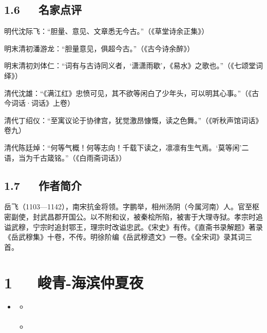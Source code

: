 \documentclass[letterpaper,12pt,english]{sphinxmanual}
\begin{document}
\section{1.6   名家点评}
\label{\detokenize{p01_u6563_u6587/_u5cb3_u98de-_u6ee1_u6c5f_u7ea2_xb7_u6012_u53d1_u51b2_u51a0:id8}}
明代沈际飞：“胆量、意见、文章悉无今古。”（《草堂诗余正集》）

明末清初潘游龙：“胆量意见，俱超今古。”（《古今诗余醉》）

明末清初刘体仁：“词有与古诗同义者，‘潇潇雨歇’，《易水》之歌也。”（《七颂堂词绎》）

清代沈雄：“《满江红》忠愤可见，其不欲等闲白了少年头，可以明其心事。”（《古今词话·词话》上卷）

清代丁绍仪：“至寓议论于协律宫，犹觉激昂慷慨，读之色舞。”（《听秋声馆词话》卷九）

清代陈廷焯：“何等气概！何等志向！千载下读之，凛凛有生气焉。‘莫等闲’二语，当为千古箴铭。”（《白雨斋词话》）


\section{1.7   作者简介}
\label{\detokenize{p01_u6563_u6587/_u5cb3_u98de-_u6ee1_u6c5f_u7ea2_xb7_u6012_u53d1_u51b2_u51a0:id9}}
岳飞（1103—1142），南宋抗金将领。字鹏举，相州汤阴（今属河南）人。官至枢密副使，封武昌郡开国公。以不附和议，被秦桧所陷，被害于大理寺狱。孝宗时追谥武穆，宁宗时追封鄂王，理宗时改谥忠武。《宋史》有传。《直斋书录解题》著录《岳武穆集》十卷，不传。明徐阶编《岳武穆遗文》一卷。《全宋词》录其词三首。


\chapter{1   峻青-海滨仲夏夜}
\label{\detokenize{p01_u6563_u6587/_u5cfb_u9752-_u6d77_u6ee8_u4ef2_u590f_u591c:id1}}\label{\detokenize{p01_u6563_u6587/_u5cfb_u9752-_u6d77_u6ee8_u4ef2_u590f_u591c::doc}}
\begin{sphinxShadowBox}
\begin{itemize}
\item {} 
\label{\detokenize{p01_u6563_u6587/_u5cfb_u9752-_u6d77_u6ee8_u4ef2_u590f_u591c:id5}}{\hyperref[\detokenize{p01_u6563_u6587/_u5cfb_u9752-_u6d77_u6ee8_u4ef2_u590f_u591c:id1}]{}}
\begin{itemize}
\item {} 
\label{\detokenize{p01_u6563_u6587/_u5cfb_u9752-_u6d77_u6ee8_u4ef2_u590f_u591c:id6}}{\hyperref[\detokenize{p01_u6563_u6587/_u5cfb_u9752-_u6d77_u6ee8_u4ef2_u590f_u591c:id3}]{}}

\item {} 
\label{\detokenize{p01_u6563_u6587/_u5cfb_u9752-_u6d77_u6ee8_u4ef2_u590f_u591c:id7}}{\hyperref[\detokenize{p01_u6563_u6587/_u5cfb_u9752-_u6d77_u6ee8_u4ef2_u590f_u591c:id4}]{}}

\end{itemize}

\end{itemize}
\end{sphinxShadowBox}
\end{document}
